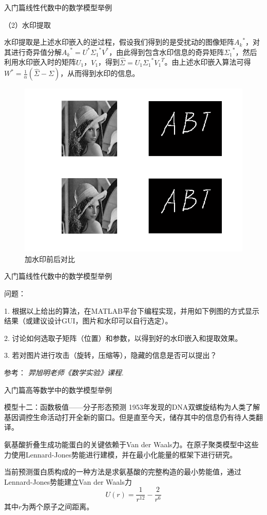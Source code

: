 \documentclass{beamer}
\begin{document}
\begin{frame}{入门篇}{线性代数中的数学模型举例}

{\color{blue} （2）水印提取}

水印提取是上述水印嵌入的逆过程，假设我们得到的是受扰动的图像矩阵${A_k}^*$，对其进行奇异值分解${A_k}^*=U^* {\Sigma_1}^* V^*$，由此得到包含水印信息的奇异矩阵${\Sigma_1}^*$，然后利用水印嵌入时的矩阵$U_1$，$V_1$，得到$\hat{\Sigma}=U_1 {\Sigma_1}^* {V_1}^T$。由上述水印嵌入算法可得$W^*=\frac{1}{\alpha}(\hat{\Sigma}-\Sigma)$，从而得到水印的信息。

\begin{figure}
  \centering
  \includegraphics[width=.5\textwidth]{figure//fig01.png} 
  \caption{加水印前后对比} 
  \label{fig01} 
\end{figure}

\end{frame}

\begin{frame}{入门篇}{线性代数中的数学模型举例}

{\color{blue} 问题：}

1. 根据以上给出的算法，在MATLAB平台下编程实现，并用如下例图的方式显示结果（或建议设计GUI，图片和水印可以自行选定）。

2. 讨论如何选取子矩阵（位置）和参数，以得到好的水印嵌入和提取效果。

3. 若对图片进行攻击（旋转，压缩等），隐藏的信息是否可以提出？

\footnotesize 参考：
\emph{羿旭明老师《数学实验》课程}.

\end{frame}


\begin{frame}{入门篇}{高等数学中的数学模型举例}
\begin{block}{模型十二：函数极值——分子形态预测}
1953年发现的DNA双螺旋结构为人类了解基因调控生命活动打开全新的窗口。但是直至今天，储存其中的信息仍有待人类翻译。

氨基酸折叠生成功能蛋白的关键依赖于Van der Waals力。在原子聚类模型中这些力使用Lennard-Jones势能进行建模，并在最小化能量的框架下进行研究。

当前预测蛋白质构成的一种方法是求氨基酸的完整构造的最小势能值，通过Lennard-Jones势能建立Van der Waals力
$$U(r)=\frac{1}{r^{12}}-\frac{2}{r^6}$$
其中$r$为两个原子之间距离。
\end{block}
\end{frame}
\end{document}
